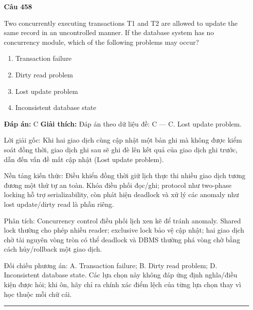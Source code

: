 \documentclass[11pt,a4paper]{article}
\newenvironment{question}[1]{%
  \par\vspace{1em}\noindent\textbf{\large Câu #1}\par\vspace{0.4em}
}{%
  \par\vspace{1em}\hrule\vspace{0.6em}
}
\newenvironment{choices}{%
  \begin{enumerate}[label=\textbf{\Alph*.},leftmargin=2.2em,itemsep=2pt,topsep=3pt]
}{%
  \end{enumerate}
}
\newcommand{\choice}{\item}
\begin{document}
\begin{question}{458}
Two concurrently executing transactions T1 and T2 are allowed to update the same record in an uncontrolled manner. If the database system has no concurrency module, which of the following problems may occur?
\begin{choices}
\choice Transaction failure
\choice Dirty read problem
\choice Lost update problem
\choice Inconsistent database state
\end{choices}
\textbf{Đáp án:} C
\textbf{Giải thích:} Đáp án theo dữ liệu đề: C — C. Lost update problem.

Lời giải gốc: Khi hai giao dịch cùng cập nhật một bản ghi mà không được kiểm soát đồng thời, giao dịch ghi sau sẽ ghi đè lên kết quả của giao dịch ghi trước, dẫn đến vấn đề mất cập nhật (Lost update problem).

Nền tảng kiến thức: Điều khiển đồng thời giữ lịch thực thi nhiều giao dịch tương đương một thứ tự an toàn. Khóa điều phối đọc/ghi; protocol như two-phase locking hỗ trợ serializability, còn phát hiện deadlock và xử lý các anomaly như lost update/dirty read là phần riêng.

Phân tích: Concurrency control điều phối lịch xen kẽ để tránh anomaly. Shared lock thường cho phép nhiều reader; exclusive lock bảo vệ cập nhật; hai giao dịch chờ tài nguyên vòng tròn có thể deadlock và DBMS thường phá vòng chờ bằng cách hủy/rollback một giao dịch.

Đối chiếu phương án: A. Transaction failure; B. Dirty read problem; D. Inconsistent database state. Các lựa chọn này không đáp ứng định nghĩa/điều kiện được hỏi; khi ôn, hãy chỉ ra chính xác điểm lệch của từng lựa chọn thay vì học thuộc mỗi chữ cái.
\end{question}
\end{document}

